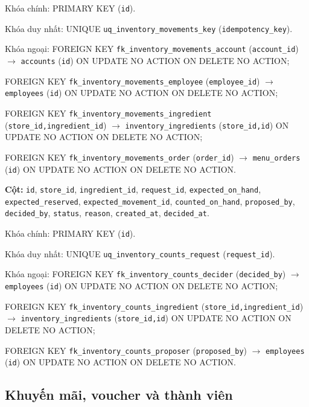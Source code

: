 \begin{description}[leftmargin=3.6cm,labelwidth=3.4cm,style=nextline]
Khóa chính: PRIMARY KEY (\texttt{id}).

Khóa duy nhất: UNIQUE \texttt{uq\_inventory\_movements\_key} (\texttt{idempotency\_key}).

Khóa ngoại: FOREIGN KEY \texttt{fk\_inventory\_movements\_account} (\texttt{account\_id}) $\rightarrow$ \texttt{accounts} (\texttt{id}) ON UPDATE NO ACTION ON DELETE NO ACTION;\par FOREIGN KEY \texttt{fk\_inventory\_movements\_employee} (\texttt{employee\_id}) $\rightarrow$ \texttt{employees} (\texttt{id}) ON UPDATE NO ACTION ON DELETE NO ACTION;\par FOREIGN KEY \texttt{fk\_inventory\_movements\_ingredient} (\texttt{store\_id,ingredient\_id}) $\rightarrow$ \texttt{inventory\_ingredients} (\texttt{store\_id,id}) ON UPDATE NO ACTION ON DELETE NO ACTION;\par FOREIGN KEY \texttt{fk\_inventory\_movements\_order} (\texttt{order\_id}) $\rightarrow$ \texttt{menu\_orders} (\texttt{id}) ON UPDATE NO ACTION ON DELETE NO ACTION.

\item[\texttt{inventory\_counts}] \textbf{Cột:} \texttt{id}, \texttt{store\_id}, \texttt{ingredient\_id}, \texttt{request\_id}, \texttt{expected\_on\_hand}, \texttt{expected\_reserved}, \texttt{expected\_movement\_id}, \texttt{counted\_on\_hand}, \texttt{proposed\_by}, \texttt{decided\_by}, \texttt{status}, \texttt{reason}, \texttt{created\_at}, \texttt{decided\_at}.

Khóa chính: PRIMARY KEY (\texttt{id}).

Khóa duy nhất: UNIQUE \texttt{uq\_inventory\_counts\_request} (\texttt{request\_id}).

Khóa ngoại: FOREIGN KEY \texttt{fk\_inventory\_counts\_decider} (\texttt{decided\_by}) $\rightarrow$ \texttt{employees} (\texttt{id}) ON UPDATE NO ACTION ON DELETE NO ACTION;\par FOREIGN KEY \texttt{fk\_inventory\_counts\_ingredient} (\texttt{store\_id,ingredient\_id}) $\rightarrow$ \texttt{inventory\_ingredients} (\texttt{store\_id,id}) ON UPDATE NO ACTION ON DELETE NO ACTION;\par FOREIGN KEY \texttt{fk\_inventory\_counts\_proposer} (\texttt{proposed\_by}) $\rightarrow$ \texttt{employees} (\texttt{id}) ON UPDATE NO ACTION ON DELETE NO ACTION.

\end{description}

\subsection{Khuyến mãi, voucher và thành viên}

